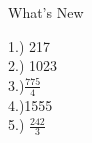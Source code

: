 \documentclass{article}
\title{}
\author{Louise Carlo Salomon}
\date{}
\begin{document}
    \maketitle
    What's New
    \begin{center}
        1.) 217\\2.) 1023\\3.)$\frac{775}{4}$ \\4.)1555\\5.) $\frac{242}{3}$
    \end{center}
\end{document}
